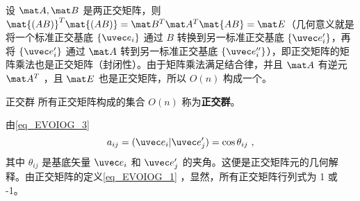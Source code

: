 设 $\mat A,\mat B$ 是两正交矩阵，则 $\mat{(AB)}^T\mat{(AB)}=\mat B^T\mat A^T\mat{AB}=\mat E$（几何意义就是将一个标准正交基底 $\{ \uvec e_i\}$ 通过 $B$ 转换到另一标准正交基底 $\{\uvec e'_i\}$，再将 $\{\uvec e'_i\}$ 通过 $\mat A$ 转到另一标准正交基底 $\{\uvec e''_i\}$），即正交矩阵的矩阵乘法也是正交矩阵（封闭性）。由于矩阵乘法满足结合律，并且 $\mat A$ 有逆元 $\mat A^T$ ，且 $\mat E$ 也是正交矩阵，所以 $O(n)$ 构成一个。
\begin{definition}{正交群}
所有正交矩阵构成的集合 $O(n)$ 称为\textbf{正交群}。
\end{definition}

由\autoref{eq_EVOIOG_3} 
\begin{equation}
a_{ij}=(\uvec e_i|\uvec e'_j)=\cos{\theta_{ij}}~,
\end{equation}
其中 $\theta_{ij}$ 是基底矢量 $\uvec e_i$ 和 $\uvec e'_j$ 的夹角。这便是正交矩阵元的几何解释。由正交矩阵的定义\autoref{eq_EVOIOG_1} ，显然，所有正交矩阵行列式为 1 或 -1。
